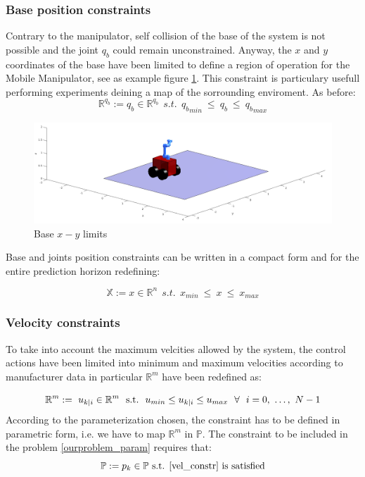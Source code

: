 \subsubsection*{Base position constraints}
	Contrary to the manipulator, self collision of the base of the system is not possible and the joint $q_b$ could remain unconstrained. Anyway, the $x$ and $y$ coordinates of the base have been limited to define a region of operation for the Mobile Manipulator, see as example figure \ref{xy_limits}. This constraint is particulary usefull performing experiments deining a map of the sorrounding enviroment. As before: 
	\begin{equation}
		\mathbb{R}^{q_b}:=q_b \in \mathbb{R}^{q_b}\ \ s.t.\ \  {q_b}_{min}\ \leq\ q_b\ \leq\ {q_b}_{max} 
	\end{equation}

	\begin{figure}[h!]
	\centering
	\includegraphics[scale=0.25]{IMMAGINI/xy_limits.png}
	\caption{Base $x-y$ limits}
	\label{xy_limits}
	\end{figure}

	Base and joints position constraints can be written in a compact form and for the entire prediction horizon redefining: 

	\begin{equation}
	\mathbb{X}:= x \in \mathbb{R}^{n}\ \ s.t.\ \  {x}_{min}\ \leq\ x\ \leq\ {x}_{max}
	\end{equation}

\subsubsection*{Velocity constraints}
	To take into account the maximum velcities allowed by the system, the control actions have been limited into minimum and maximum velocities according to manufacturer data in particular $\mathbb{R}^m$ have been redefined as:

	\begin{equation*}
	\mathbb{R}^m:=\ {u}_{k|i} \in \mathbb{R}^m\ \ \textnormal{s.t.}\ \ u_{min}\leq{u_{k|i}}\leq u_{max}\ \ \forall\ \  i=0,\ \dots,\ N-1
	\label{vel_constr}
	\end{equation*}
	According to the parameterization chosen, the constraint has to be defined in parametric form, i.e. we have to map $\mathbb{R}^m$ in $\mathbb{P}$. The constraint to be included in the problem \ref{ourproblem_param} requires that:
	\begin{equation*}
		\mathbb{P}:=p_k \in \mathbb{P} \textnormal{  s.t. \ref{vel_constr} is satisfied}
	\end{equation*}

